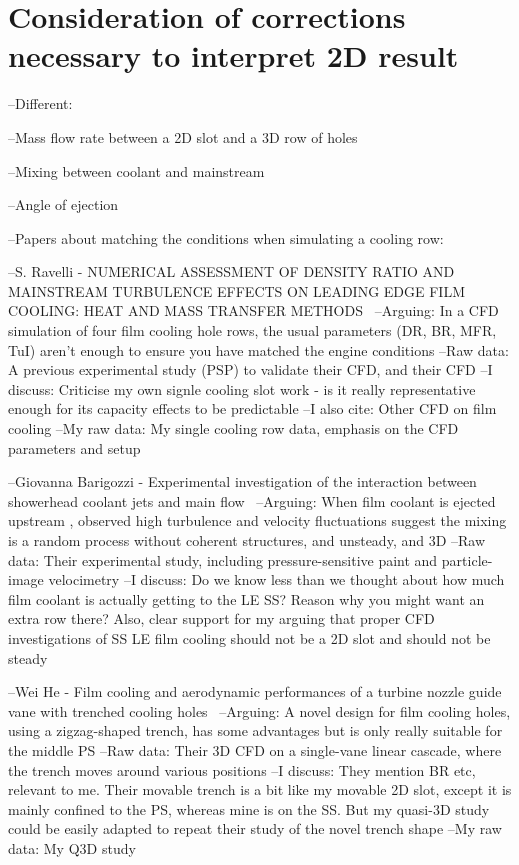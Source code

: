 \documentclass[a4paper, 11pt, twoside]{report}
\begin{document}
    
\section{Consideration of corrections necessary to interpret 2D result}

--Different:

--Mass flow rate between a 2D slot and a 3D row of holes

--Mixing between coolant and mainstream

--Angle of ejection

--Papers about matching the conditions when simulating a cooling row:

--S. Ravelli - NUMERICAL ASSESSMENT OF DENSITY RATIO AND MAINSTREAM TURBULENCE EFFECTS ON LEADING EDGE FILM COOLING: HEAT AND MASS TRANSFER METHODS~\cite{ravelli_engine_conditions}
		--Arguing: In a CFD simulation of four film cooling hole rows, the usual parameters (DR, BR, MFR, TuI) aren't enough to ensure you have matched the engine conditions
		--Raw data: A previous experimental study (PSP) to validate their CFD, and their CFD
		--I discuss: Criticise my own signle cooling slot work - is it really representative enough for its capacity effects to be predictable
		--I also cite: Other CFD on film cooling
		--My raw data: My single cooling row data, emphasis on the CFD parameters and setup
		
--Giovanna Barigozzi - Experimental investigation of the interaction between showerhead coolant jets and main flow~\cite{barigozzi_film_cooling}
		--Arguing: When film coolant is ejected upstream , observed high turbulence and velocity fluctuations suggest the mixing is a random process without coherent structures, and unsteady, and 3D
		--Raw data: Their experimental study, including pressure-sensitive paint and particle-image velocimetry
		--I discuss: Do we know less than we thought about how much film coolant is actually getting to the LE SS? Reason why you might want an extra row there? Also, clear support for my arguing that proper CFD investigations of SS LE film cooling should not be a 2D slot and should not be steady
		
--Wei He - Film cooling and aerodynamic performances of a turbine nozzle guide vane with trenched cooling holes~\cite{he_film_cooling}
		--Arguing: A novel design for film cooling holes, using a zigzag-shaped trench, has some advantages but is only really suitable for the middle PS
		--Raw data: Their 3D CFD on a single-vane linear cascade, where the trench moves around various positions
		--I discuss: They mention BR etc, relevant to me. Their movable trench is a bit like my movable 2D slot, except it is mainly confined to the PS, whereas mine is on the SS. But my quasi-3D study could be easily adapted to repeat their study of the novel trench shape
		--My raw data: My Q3D study





\end{document}

